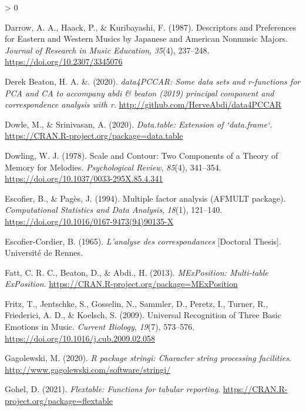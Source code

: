 \documentclass[
  english,
  man]{apa6}
\newlength{\cslhangindent}
\newenvironment{CSLReferences}[2] %
 {%
  \setlength{\parindent}{0pt}
  \ifodd #1 \everypar{\setlength{\hangindent}{\cslhangindent}}\ignorespaces\fi
  \ifnum #2 > 0
  \setlength{\parskip}{#2\baselineskip}
  \fi
 }%
 {}
\begin{document}
\begin{CSLReferences}{1}{0}
\leavevmode\hypertarget{ref-Darrow1987}{}%
Darrow, A. A., Haack, P., \& Kuribayashi, F. (1987). {Descriptors and Preferences for Eastern and Western Musics by Japanese and American Nonmusic Majors}. \emph{Journal of Research in Music Education}, \emph{35}(4), 237--248. \url{https://doi.org/10.2307/3345076}

\leavevmode\hypertarget{ref-R-data4PCCAR}{}%
Derek Beaton, H. A. \&. (2020). \emph{data4PCCAR: Some data sets and r-functions for PCA and CA to accompany abdi \& beaton (2019) principal component and correspondence analysis with r}. \url{http://github.com/HerveAbdi/data4PCCAR}

\leavevmode\hypertarget{ref-R-data.table}{}%
Dowle, M., \& Srinivasan, A. (2020). \emph{Data.table: Extension of `data.frame`}. \url{https://CRAN.R-project.org/package=data.table}

\leavevmode\hypertarget{ref-Dowling1978a}{}%
Dowling, W. J. (1978). {Scale and Contour: Two Components of a Theory of Memory for Melodies}. \emph{Psychological Review}, \emph{85}(4), 341--354. \url{https://doi.org/10.1037/0033-295X.85.4.341}

\leavevmode\hypertarget{ref-Escofier1994}{}%
Escofier, B., \& Pagès, J. (1994). {Multiple factor analysis (AFMULT package)}. \emph{Computational Statistics and Data Analysis}, \emph{18}(1), 121--140. \url{https://doi.org/10.1016/0167-9473(94)90135-X}

\leavevmode\hypertarget{ref-Escofier-Cordier1965}{}%
Escofier-Cordier, B. (1965). \emph{{L'analyse des correspondances}} {[}Doctoral Thesis{]}. Universit{é} de Rennes.

\leavevmode\hypertarget{ref-R-MExPosition}{}%
Fatt, C. R. C., Beaton, D., \& Abdi., H. (2013). \emph{MExPosition: Multi-table ExPosition}. \url{https://CRAN.R-project.org/package=MExPosition}

\leavevmode\hypertarget{ref-Fritz2009}{}%
Fritz, T., Jentschke, S., Gosselin, N., Sammler, D., Peretz, I., Turner, R., Friederici, A. D., \& Koelsch, S. (2009). {Universal Recognition of Three Basic Emotions in Music}. \emph{Current Biology}, \emph{19}(7), 573--576. \url{https://doi.org/10.1016/j.cub.2009.02.058}

\leavevmode\hypertarget{ref-R-stringi}{}%
Gagolewski, M. (2020). \emph{R package stringi: Character string processing facilities}. \url{http://www.gagolewski.com/software/stringi/}

\leavevmode\hypertarget{ref-R-flextable}{}%
Gohel, D. (2021). \emph{Flextable: Functions for tabular reporting}. \url{https://CRAN.R-project.org/package=flextable}


\end{CSLReferences}
\end{document}
